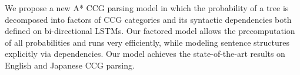 We propose a new A* CCG parsing model in which the probability of a tree is decomposed into factors of CCG categories and its syntactic dependencies both defined on bi-directional LSTMs. Our factored model allows the precomputation of all probabilities and runs very efficiently, while modeling sentence structures explicitly via dependencies. Our model achieves the state-of-the-art results on English and Japanese CCG parsing.
